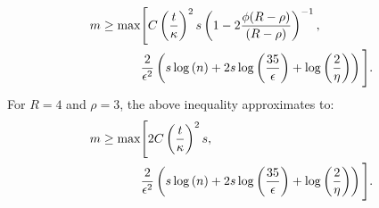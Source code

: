 \begin{align}
m \geq \max & \Bigg[ C\left(\frac{t}{\kappa}\right)^2s \left(1-2\frac{\phi(R-\rho)}{(R-\rho)} \right)^{-1}, \nonumber \\ 
& \frac{2}{\eps^2}\left(s\log{(n)} + 2s\log{\left(\frac{35}{\eps}\right)}+\log{\left(\frac{2}{\eta}\right)}\right)\Bigg].
\label{eq:ineq4}
\end{align}
For $R=4$ and $\rho =3$, the above inequality approximates to:
\begin{align*}
m \geq \max & \Bigg[ 2C\left(\frac{t}{\kappa}\right)^2s, \nonumber \\ 
& \frac{2}{\epsilon^2}\left(s\log{(n)} + 2s\log{\left(\frac{35}{\epsilon}\right)}+\log{\left(\frac{2}{\eta}\right)}\right)\Bigg].
\end{align*}
